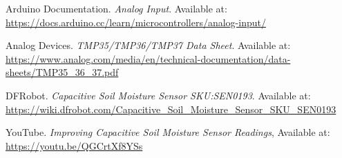 \documentclass[a4paper,11pt]{article}
\begin{document}
\begin{thebibliography}{9}

Arduino Documentation. \textit{Analog Input}. Available at: \url{https://docs.arduino.cc/learn/microcontrollers/analog-input/}

Analog Devices. \textit{TMP35/TMP36/TMP37 Data Sheet}. Available at: \url{https://www.analog.com/media/en/technical-documentation/data-sheets/TMP35_36_37.pdf}

DFRobot. \textit{Capacitive Soil Moisture Sensor SKU:SEN0193}. Available at: \url{https://wiki.dfrobot.com/Capacitive_Soil_Moisture_Sensor_SKU_SEN0193}

YouTube. \textit{Improving Capacitive Soil Moisture Sensor Readings}, Available at: \url{https://youtu.be/QGCrtXf8YSs}

\end{thebibliography}
\end{document}
